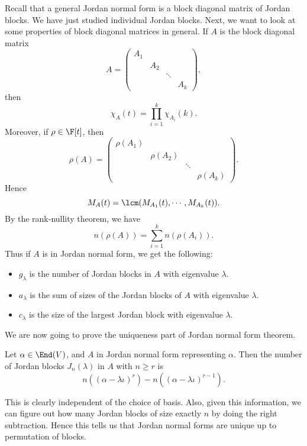 \documentclass[a4paper]{article}
\begin{document}
Recall that a general Jordan normal form is a block diagonal matrix of Jordan blocks. We have just studied individual Jordan blocks. Next, we want to look at some properties of block diagonal matrices in general. If $A$ is the block diagonal matrix
\[
  A =
  \begin{pmatrix}
    A_1\\
    & A_2\\
    & & \ddots\\
    & & & A_k
  \end{pmatrix},
\]
then
\[
  \chi_A(t) = \prod_{i = 1}^k \chi_{A_i}(k).
\]
Moreover, if $\rho \in \F[t]$, then
\[
  \rho (A) =
  \begin{pmatrix}
    \rho(A_1)\\
    & \rho(A_2)\\
    & & \ddots\\
    & & & \rho(A_k)
  \end{pmatrix}.
\]
Hence
\[
  M_A(t) = \lcm (M_{A_1}(t), \cdots, M_{A_k} (t)).
\]
By the rank-nullity theorem, we have
\[
  n(\rho(A)) = \sum_{i = 1}^k n(\rho(A_i)).
\]
Thus if $A$ is in Jordan normal form, we get the following:
\begin{itemize}
  \item $g_\lambda$ is the number of Jordan blocks in $A$ with eigenvalue $\lambda$.
  \item $a_\lambda$ is the sum of sizes of the Jordan blocks of $A$ with eigenvalue $\lambda$.
  \item $c_\lambda$ is the size of the largest Jordan block with eigenvalue $\lambda$.
\end{itemize}

We are now going to prove the uniqueness part of Jordan normal form theorem.
\begin{thm}
  Let $\alpha \in \End(V)$, and $A$ in Jordan normal form representing $\alpha$. Then the number of Jordan blocks $J_n(\lambda)$ in $A$ with $n \geq r$ is
  \[
    n((\alpha - \lambda\iota)^r) - n((\alpha - \lambda\iota)^{r - 1}).
  \]
\end{thm}
This is clearly independent of the choice of basis. Also, given this information, we can figure out how many Jordan blocks of size exactly $n$ by doing the right subtraction. Hence this tells us that Jordan normal forms are unique up to permutation of blocks.
\end{document}
